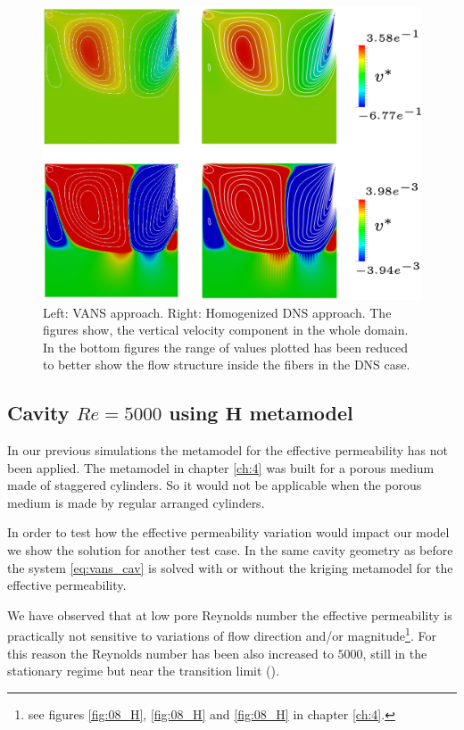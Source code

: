 \begin{figure}
	\centering
	\includegraphics[width=0.9\linewidth]{chapter_5/figure/re_100_big/uy}
	\caption{Left: VANS approach. Right: Homogenized DNS approach. The figures show, the vertical velocity component in the whole domain. In the bottom figures the range of values plotted has been reduced to better show the flow structure inside the fibers in the DNS case.}
	\label{fig:uy}
\end{figure}


\subsection{Cavity $Re=5000$ using $\mathbf{H}$ metamodel}
\label{pr:mata_cav}
In our previous simulations the metamodel for the effective permeability has not been applied.  The metamodel in chapter \ref{ch:4} was built for a porous medium made of staggered cylinders. So it would not be applicable when the porous medium is made by regular arranged cylinders.

In order to test how the effective permeability variation would impact our model we show the solution for another test case. In the same cavity geometry as before the system \eqref{eq:vans_cav} is solved with or without the kriging metamodel for the effective permeability.

We have observed that at low pore Reynolds number the effective permeability is practically not sensitive to variations of flow direction and/or magnitude\footnote{see figures \ref{fig:08_H}, \ref{fig:08_H} and \ref{fig:08_H} in chapter \ref{ch:4}.}.
For this reason the Reynolds number has been also increased to $5000$, still in the stationary regime but near the transition limit (\citet{peng2003transition}).

